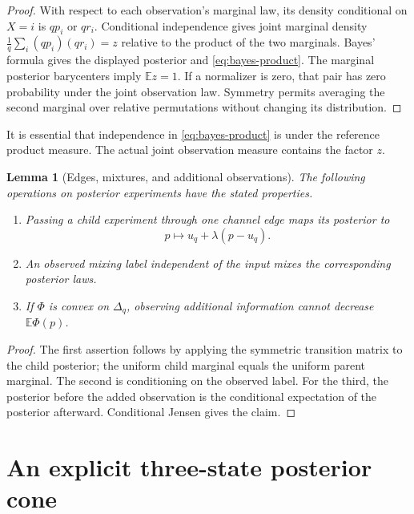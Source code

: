 \documentclass[11pt,reqno]{amsart}
\newtheorem{lemma}[theorem]{Lemma}
\theoremstyle{definition}
\theoremstyle{remark}
\newcommand{\E}{\mathbb E}
\begin{document}
\begin{proof}
With respect to each observation's marginal law, its density conditional on $X=i$ is $q p_i$ or $q r_i$. Conditional independence gives joint marginal density $\frac1q\sum_i(qp_i)(qr_i)=z$ relative to the product of the two marginals. Bayes' formula gives the displayed posterior and \eqref{eq:bayes-product}. The marginal posterior barycenters imply $\E z=1$. If a normalizer is zero, that pair has zero probability under the joint observation law. Symmetry permits averaging the second marginal over relative permutations without changing its distribution.
\end{proof}

It is essential that independence in \eqref{eq:bayes-product} is under the reference product measure. The actual joint observation measure contains the factor $z$.

\begin{lemma}[Edges, mixtures, and additional observations]\label{lem:operations}
The following operations on posterior experiments have the stated properties.
\begin{enumerate}
\item Passing a child experiment through one channel edge maps its posterior to
\begin{equation}\label{eq:edge}
 p\longmapsto u_q+\lambda(p-u_q).
\end{equation}
\item An observed mixing label independent of the input mixes the corresponding posterior laws.
\item If $\Phi$ is convex on $\Delta_q$, observing additional information cannot decrease $\E\Phi(p)$.
\end{enumerate}
\end{lemma}

\begin{proof}
The first assertion follows by applying the symmetric transition matrix to the child posterior; the uniform child marginal equals the uniform parent marginal. The second is conditioning on the observed label. For the third, the posterior before the added observation is the conditional expectation of the posterior afterward. Conditional Jensen gives the claim.
\end{proof}

\section{An explicit three-state posterior cone}\label{sec:q3}
\end{document}
